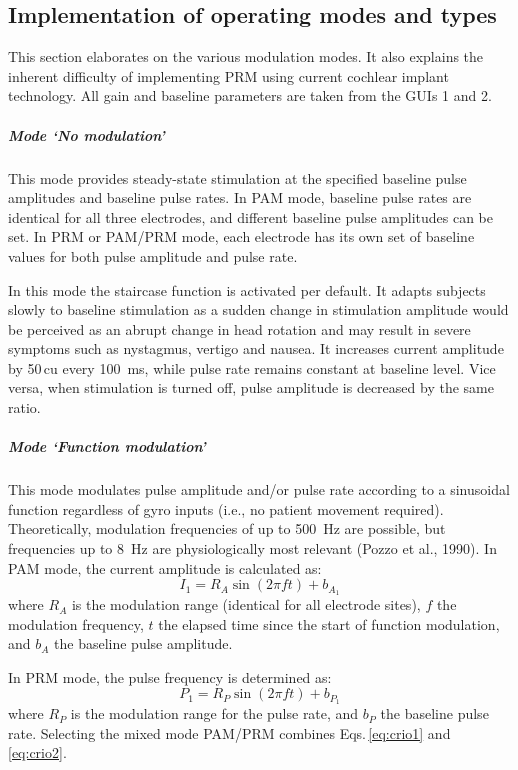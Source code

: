 \subsection{Implementation of operating modes and types}
This section elaborates on the various modulation modes. It also explains the inherent difficulty of implementing PRM using current cochlear implant technology. All gain and baseline parameters are taken from the GUIs 1 and 2.

\subparagraph{Mode ‘No modulation’}
This mode provides steady-state stimulation at the specified baseline pulse amplitudes and baseline pulse rates. In PAM mode, baseline pulse rates are identical for all three electrodes, and different baseline pulse amplitudes can be set. In PRM or PAM/PRM mode, each electrode has its own set of baseline values for both pulse amplitude and pulse rate.

	In this mode the staircase function is activated per default. It adapts subjects slowly to baseline stimulation as a sudden change in stimulation amplitude would be perceived as an abrupt change in head rotation and may result in severe symptoms such as nystagmus, vertigo and nausea. It increases current amplitude by 50\,cu every \SI{100}{\milli\second}, while pulse rate remains constant at baseline level. Vice versa, when stimulation is turned off, pulse amplitude is decreased by the same ratio.
	
\subparagraph{Mode ‘Function modulation’}
This mode modulates pulse amplitude and/or pulse rate according to a sinusoidal function regardless of gyro inputs (i.e., no patient movement required). Theoretically, modulation frequencies of up to \SI{500}{\hertz} are possible, but frequencies up to \SI{8}{\hertz} are physiologically most relevant (Pozzo et al., 1990).
In PAM mode, the current amplitude is calculated as:
\begin{equation}\label{eq:crio1}
I_1 = R_A \sin \left( 2\pi f t \right) + b_{A_1}
\end{equation}
where $R_A$ is the modulation range  (identical for all electrode sites), $f$ the modulation frequency, $t$ the elapsed time since the start of function modulation, and $b_A$ the baseline pulse amplitude.

In PRM mode, the pulse frequency is determined as:
\begin{equation}\label{eq:crio2}
P_1 = R_P \sin \left( 2\pi f t \right) + b_{P_1}
\end{equation}
where $R_P$ is the modulation range for the pulse rate, and $b_P$ the baseline pulse rate. Selecting the mixed mode PAM/PRM combines Eqs.\,\eqref{eq:crio1} and \eqref{eq:crio2}.


